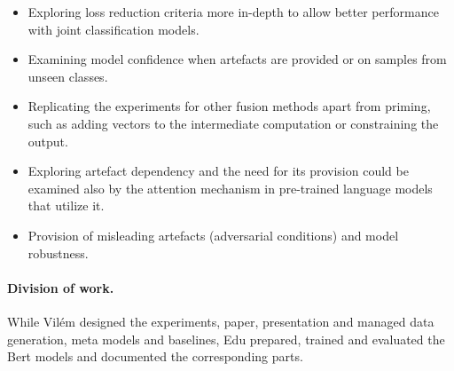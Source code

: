 \begin{itemize}[left=0.0cm,topsep=0.1cm,noitemsep]
\item Exploring loss reduction criteria more in-depth to allow better performance with joint classification models.
\item Examining model confidence when artefacts are provided or on samples from unseen classes.
\item Replicating the experiments for other fusion methods apart from priming, such as adding vectors to the intermediate computation or constraining the output.
\item Exploring artefact dependency and the need for its provision could be examined also by the attention mechanism in pre-trained language models that utilize it.
\item Provision of misleading artefacts (adversarial conditions) and model robustness.
\end{itemize}

\paragraph{Division of work.}

While Vilém designed the experiments, paper, presentation and managed data generation, meta models and baselines, Edu prepared, trained and evaluated the Bert models and documented the corresponding parts.